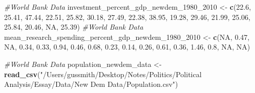 \documentclass[]{article}
\newenvironment{Shaded}{\begin{snugshade}}{\end{snugshade}}
\newcommand{\CommentTok}[1]{\textcolor[rgb]{0.56,0.35,0.01}{\textit{#1}}}
\newcommand{\DecValTok}[1]{\textcolor[rgb]{0.00,0.00,0.81}{#1}}
\newcommand{\FloatTok}[1]{\textcolor[rgb]{0.00,0.00,0.81}{#1}}
\newcommand{\KeywordTok}[1]{\textcolor[rgb]{0.13,0.29,0.53}{\textbf{#1}}}
\newcommand{\NormalTok}[1]{#1}
\newcommand{\OtherTok}[1]{\textcolor[rgb]{0.56,0.35,0.01}{#1}}
\newcommand{\StringTok}[1]{\textcolor[rgb]{0.31,0.60,0.02}{#1}}
\begin{document}
\begin{Shaded}
\begin{Highlighting}[]
\CommentTok{#World Bank Data}
\NormalTok{investment_percent_gdp_newdem_}\DecValTok{1980}\NormalTok{_}\DecValTok{2010}\NormalTok{ <-}\StringTok{ }\KeywordTok{c}\NormalTok{(}\FloatTok{22.6}\NormalTok{, }\FloatTok{25.41}\NormalTok{, }\FloatTok{47.44}\NormalTok{, }\FloatTok{22.51}\NormalTok{, }\FloatTok{25.82}\NormalTok{, }\FloatTok{30.18}\NormalTok{,}
                                             \FloatTok{27.49}\NormalTok{, }\FloatTok{22.38}\NormalTok{, }\FloatTok{38.95}\NormalTok{, }\FloatTok{19.28}\NormalTok{, }\FloatTok{29.46}\NormalTok{, }\FloatTok{21.99}\NormalTok{,}
                                             \FloatTok{25.06}\NormalTok{, }\FloatTok{25.84}\NormalTok{, }\FloatTok{20.46}\NormalTok{, }\OtherTok{NA}\NormalTok{, }\FloatTok{25.39}\NormalTok{)}
\CommentTok{#World Bank Data}
\NormalTok{mean_research_spending_percent_gdp_newdem_}\DecValTok{1980}\NormalTok{_}\DecValTok{2010}\NormalTok{ <-}\StringTok{ }\KeywordTok{c}\NormalTok{(}\OtherTok{NA}\NormalTok{, }\FloatTok{0.47}\NormalTok{, }\OtherTok{NA}\NormalTok{, }\FloatTok{0.34}\NormalTok{, }\FloatTok{0.33}\NormalTok{, }
                                                         \FloatTok{0.94}\NormalTok{, }\FloatTok{0.46}\NormalTok{, }\FloatTok{0.68}\NormalTok{, }\FloatTok{0.23}\NormalTok{,}
                                                         \FloatTok{0.14}\NormalTok{, }\FloatTok{0.26}\NormalTok{, }\FloatTok{0.61}\NormalTok{, }\FloatTok{0.36}\NormalTok{, }\FloatTok{1.46}\NormalTok{,}
                                                         \FloatTok{0.8}\NormalTok{, }\OtherTok{NA}\NormalTok{, }\OtherTok{NA}\NormalTok{)}

\CommentTok{#World Bank Data}
\NormalTok{population_newdem_data <-}\StringTok{ }\KeywordTok{read_csv}\NormalTok{(}\StringTok{"/Users/gussmith/Desktop/Notes/Politics/Political Analysis/Essay/Data/New Dem Data/Population.csv"}\NormalTok{)}


\end{Highlighting}
\end{Shaded}
\end{document}
